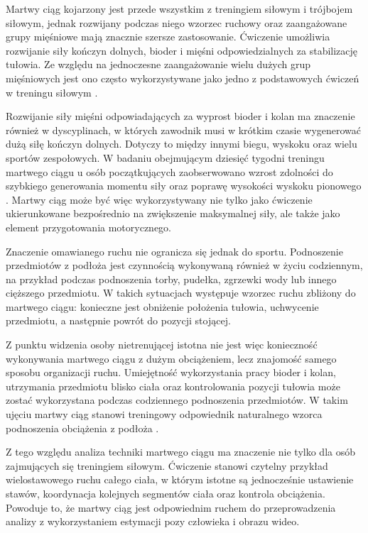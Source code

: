 Martwy ciąg kojarzony jest przede wszystkim z treningiem siłowym i trójbojem siłowym, jednak rozwijany podczas niego wzorzec ruchowy oraz zaangażowane grupy mięśniowe mają znacznie szersze zastosowanie. Ćwiczenie umożliwia rozwijanie siły kończyn dolnych, bioder i mięśni odpowiedzialnych za stabilizację tułowia. Ze względu na jednoczesne zaangażowanie wielu dużych grup mięśniowych jest ono często wykorzystywane jako jedno z podstawowych ćwiczeń w treningu siłowym \cite{martinfuentes2020deadlift}.

Rozwijanie siły mięśni odpowiadających za wyprost bioder i kolan ma znaczenie również w dyscyplinach, w których zawodnik musi w krótkim czasie wygenerować dużą siłę kończyn dolnych. Dotyczy to między innymi biegu, wyskoku oraz wielu sportów zespołowych. W badaniu obejmującym dziesięć tygodni treningu martwego ciągu u osób początkujących zaobserwowano wzrost zdolności do szybkiego generowania momentu siły oraz poprawę wysokości wyskoku pionowego \cite{thompson2015deadlift}. Martwy ciąg może być więc wykorzystywany nie tylko jako ćwiczenie ukierunkowane bezpośrednio na zwiększenie maksymalnej siły, ale także jako element przygotowania motorycznego.

Znaczenie omawianego ruchu nie ogranicza się jednak do sportu. Podnoszenie przedmiotów z podłoża jest czynnością wykonywaną również w życiu codziennym, na przykład podczas podnoszenia torby, pudełka, zgrzewki wody lub innego cięższego przedmiotu. W takich sytuacjach występuje wzorzec ruchu zbliżony do martwego ciągu: konieczne jest obniżenie położenia tułowia, uchwycenie przedmiotu, a następnie powrót do pozycji stojącej.

Z punktu widzenia osoby nietrenującej istotna nie jest więc konieczność wykonywania martwego ciągu z dużym obciążeniem, lecz znajomość samego sposobu organizacji ruchu. Umiejętność wykorzystania pracy bioder i kolan, utrzymania przedmiotu blisko ciała oraz kontrolowania pozycji tułowia może zostać wykorzystana podczas codziennego podnoszenia przedmiotów. W takim ujęciu martwy ciąg stanowi treningowy odpowiednik naturalnego wzorca podnoszenia obciążenia z podłoża \cite{martinfuentes2020deadlift}.

Z tego względu analiza techniki martwego ciągu ma znaczenie nie tylko dla osób zajmujących się treningiem siłowym. Ćwiczenie stanowi czytelny przykład wielostawowego ruchu całego ciała, w którym istotne są jednocześnie ustawienie stawów, koordynacja kolejnych segmentów ciała oraz kontrola obciążenia. Powoduje to, że martwy ciąg jest odpowiednim ruchem do przeprowadzenia analizy z wykorzystaniem estymacji pozy człowieka i obrazu wideo.


